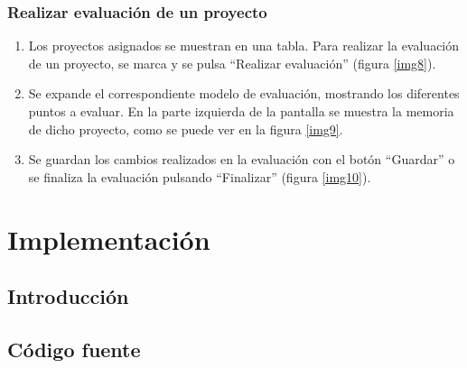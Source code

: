 \documentclass[12pt,a4paper,spanish,twoside]{book}
\begin{document}
\subsection{Realizar evaluación de un proyecto}
\begin{enumerate}
\item Los proyectos asignados se muestran en una tabla. Para realizar la 
  evaluación de un proyecto, se marca y se pulsa ``Realizar evaluación''
  (figura \ref{img8}). 


\item Se expande el correspondiente modelo de evaluación, mostrando los 
  diferentes puntos a evaluar. En la parte izquierda de la pantalla se
  muestra la memoria de dicho proyecto, como se puede ver en la figura
  \ref{img9}. 


\item Se guardan los cambios realizados en la evaluación con el botón 
  ``Guardar'' o se finaliza la evaluación pulsando ``Finalizar'' (figura 
  \ref{img10}).
  
\end{enumerate}

\chapter{Implementación}
\section{Introducción}

\section{Código fuente}
% 

% 
\end{document}

